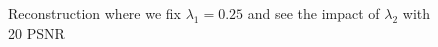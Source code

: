 \documentclass[a4paper,11pt,oneside]{report}
\theoremstyle{named}
\begin{document}
\begin{figure}
    \centering
    \caption{Reconstruction where we fix $\lambda_1 = 0.25$ and see the impact of $\lambda_2$ with 20 PSNR}
    \label{fig:20 lossl2 rec}
\end{figure}
\end{document}
